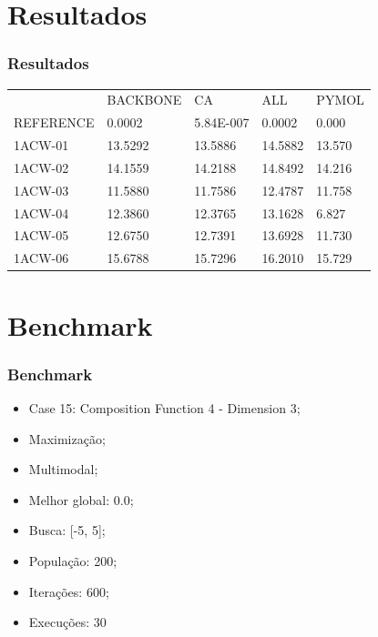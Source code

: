 \documentclass{beamer}
\begin{document}
\section{Resultados}

\begin{frame}
\frametitle{Resultados}
\begin{table}[]
\centering
\label{my-label}
\begin{tabular}{lllll}
          & BACKBONE          & CA            & ALL    & PYMOL           \\
REFERENCE & 0.0002 & 5.84E-007     & 0.0002 & 0.000 \\
1ACW-01   & 13.5292     & 13.5886 & 14.5882 & 13.570   \\
1ACW-02   & 14.1559     & 14.2188 & 14.8492 & 14.216    \\
1ACW-03   & 11.5880     & 11.7586 & 12.4787 & 11.758   \\
1ACW-04   & 12.3860     & 12.3765 & 13.1628 & 6.827  \\
1ACW-05   & 12.6750     & 12.7391 & 13.6928 & 11.730   \\
1ACW-06   & 15.6788     & 15.7296 & 16.2010 & 15.729                   
\end{tabular}
\end{table}
\end{frame}

\section{Benchmark}

\begin{frame}
\frametitle{Benchmark}
\begin{itemize}
\item Case 15: Composition Function 4 - Dimension 3;
\item Maximização;
\item Multimodal;
\item Melhor global: 0.0;
\item Busca: [-5, 5];
\item População: 200;
\item Iterações: 600;
\item Execuções: 30
\end{itemize}
\end{frame}
\end{document}
